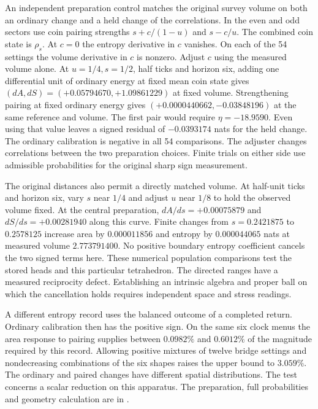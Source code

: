 \documentclass[11pt]{article}
\begin{document}
An independent preparation control matches the original survey volume
on both an ordinary change and a held change of the correlations.
In the even and odd sectors use coin pairing strengths $s+c/(1-u)$
and $s-c/u$. The combined coin state is $\rho_s$. At $c=0$ the
entropy derivative in $c$ vanishes. On each of the 54 settings the
volume derivative in $c$ is nonzero. Adjust $c$ using the measured
volume alone. At $u=1/4,s=1/2$, half ticks and horizon six, adding
one differential unit of ordinary energy at fixed mean coin state gives
$(dA,dS)=(+0.05794670,+1.09861229)$ at fixed volume. Strengthening
pairing at fixed ordinary energy gives $(+0.0000440662,-0.03848196)$
at the same reference and volume. The first pair would require
$\eta=-18.9590$. Even using that value leaves a signed residual
of $-0.0393174$ nats for the held change. The ordinary calibration
is negative in all 54 comparisons. The adjuster changes correlations
between the two preparation choices. Finite trials on either side
use admissible probabilities for the original sharp sign measurement.

The original distances also permit a directly matched volume. At
half-unit ticks and horizon six, vary $s$ near $1/4$ and adjust $u$
near $1/8$ to hold the observed volume fixed. At the central
preparation, $dA/ds=+0.00075879$ and $dS/ds=+0.00281940$ along this
curve. Finite changes from $s=0.2421875$ to $0.2578125$ increase
area by $0.000011856$ and entropy by $0.000044065$ nats at measured
volume $2.773791400$. No positive boundary entropy coefficient cancels
the two signed terms here. These numerical population comparisons test
the stored heads and this particular tetrahedron. The directed ranges
have a measured reciprocity defect. Establishing an intrinsic algebra
and proper ball on which the cancellation holds requires independent
space and stress readings.

A different entropy record uses the balanced outcome of a completed
return. Ordinary calibration then has the positive sign. On the same
six clock menus the area response to pairing supplies between
$0.0982\%$ and $0.6012\%$ of the magnitude required by this record.
Allowing positive mixtures of twelve bridge settings and nondecreasing
combinations of the six shapes raises the upper bound to $3.059\%$.
The ordinary and paired changes have different spatial distributions.
The test concerns a scalar reduction on this apparatus.
The preparation, full probabilities and geometry calculation are in
.
\end{document}
